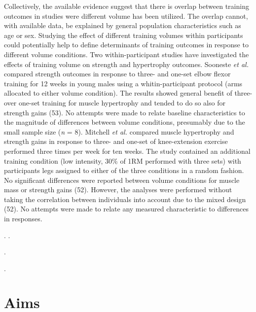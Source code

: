 \documentclass[twoside,10pt]{gihclass} %
\begin{document}
Collectively, the available evidence suggest that there is overlap between training outcomes in studies were different volume has been utilized.
The overlap cannot, with available data, be explained by general population characteristics such as age or sex.
Studying the effect of different training volumes within participants could potentially help to define determinants of training outcomes in response to different volume conditions.
Two within-participant studies have investigated the effects of training volume on strength and hypertrophy outcomes.
Sooneste \emph{et al.} compared strength outcomes in response to three- and one-set elbow flexor training for 12 weeks in young males using a whitin-participant protocol (arms allocated to either volume condition).
The results showed general benefit of three- over one-set training for muscle hypertrophy and tended to do so also for strength gains (53).
No attempts were made to relate baseline characteristics to the magnitude of differences between volume conditions, presumably due to the small sample size (\emph{n} = 8).
Mitchell \emph{et al.} compared muscle hypertrophy and strength gains in response to three- and one-set of knee-extension exercise performed three times per week for ten weeks.
The study contained an additional training condition (low intensity, 30\% of 1RM performed with three sets) with participants legs assigned to either of the three conditions in a random fashion.
No significant differences were reported between volume conditions for muscle mass or strength gains (52).
However, the analyses were performed without taking the correlation between individuals into account due to the mixed design (52).
No attempts were made to relate any measured characteristic to differences in responses.

.
.

.

.

\hypertarget{aims}{%
\chapter{Aims}\label{aims}}
\end{document}
